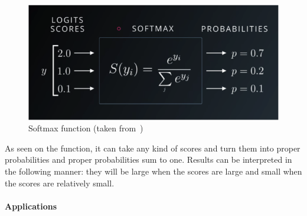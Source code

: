 \begin{figure}[htbp]
  \centering
  \includegraphics[width=\textwidth]{images/softmax}
  \caption{ Softmax function (taken from~\cite{hinton13}) }
  \label{fig:softmax}
\end{figure}

As seen on the  function, it can take any kind of scores and turn them into proper probabilities and proper probabilities sum to one.  Results can be interpreted in the following manner: they will be large when the scores are large and small when the scores are relatively small. 
\paragraph{Applications}




\endinput

